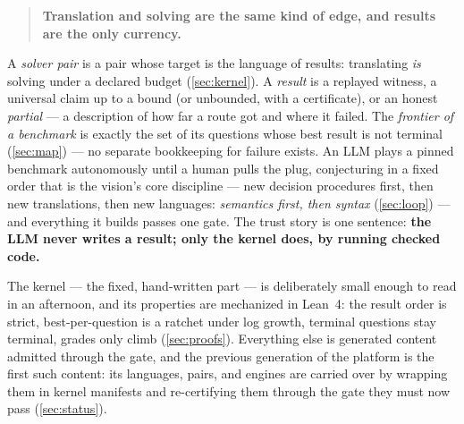 \begin{quote}
\textbf{Translation and solving are the same kind of edge, and
results are the only currency.}
\end{quote}

A \emph{solver pair} is a pair whose target is the language of
results: translating \emph{is} solving under a declared budget
(\cref{sec:kernel}). A \emph{result} is a replayed witness, a
universal claim up to a bound (or unbounded, with a certificate), or
an honest \emph{partial} --- a description of how far a route got and
where it failed. The \emph{frontier of a benchmark} is exactly the
set of its questions whose best result is not terminal
(\cref{sec:map}) --- no separate bookkeeping for failure exists. An
LLM plays a pinned benchmark autonomously until a human pulls the
plug, conjecturing in a fixed order that is the vision's core
discipline --- new decision procedures first, then new translations,
then new languages: \emph{semantics first, then syntax}
(\cref{sec:loop}) --- and everything it builds passes one gate. The
trust story is one sentence: \textbf{the LLM never writes a result;
only the kernel does, by running checked code.}

The kernel --- the fixed, hand-written part --- is deliberately small
enough to read in an afternoon, and its properties are mechanized in
Lean~4: the result order is strict, best-per-question is a ratchet
under log growth, terminal questions stay terminal, grades only climb
(\cref{sec:proofs}). Everything else is generated content admitted
through the gate, and the previous generation of the platform is the
first such content: its languages, pairs, and engines are carried
over by wrapping them in kernel manifests and re-certifying them
through the gate they must now pass (\cref{sec:status}).

